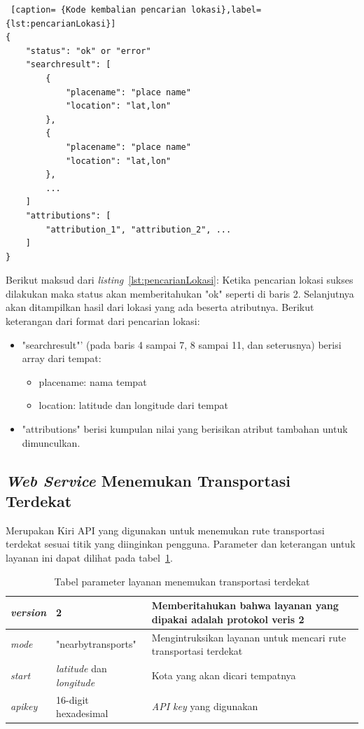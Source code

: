 \begin{lstlisting} [caption= {Kode kembalian pencarian lokasi},label={lst:pencarianLokasi}]
{
    "status": "ok" or "error"
    "searchresult": [
        {
            "placename": "place name"
            "location": "lat,lon"
        },
        {
            "placename": "place name"
            "location": "lat,lon"
        },
        ...
    ]
    "attributions": [
        "attribution_1", "attribution_2", ...
    ]
}
\end{lstlisting}
Berikut maksud dari \textit{listing}~\ref{lst:pencarianLokasi}: 
\newline
\hspace{0.5cm} Ketika pencarian lokasi sukses dilakukan maka status akan memberitahukan "ok" seperti di baris 2. Selanjutnya akan ditampilkan hasil dari lokasi yang ada beserta atributnya. Berikut keterangan dari format dari pencarian lokasi:
\begin{itemize}
	\item "searchresult"' (pada baris 4 sampai 7, 8 sampai 11, dan seterusnya) berisi array dari tempat:
	\begin{itemize}
		\item placename: nama tempat
		\item location: latitude dan longitude dari tempat
	\end{itemize}
	\item "attributions" berisi kumpulan nilai yang berisikan atribut tambahan untuk dimunculkan.
\end{itemize}	

\subsection{\textit{Web Service} Menemukan Transportasi Terdekat}
\label{subsec:Service Menemukan Transportasi Terdekat}
\hspace{0.5cm} Merupakan Kiri API yang digunakan untuk menemukan rute transportasi terdekat sesuai titik yang diinginkan pengguna. Parameter dan keterangan untuk layanan ini dapat dilihat pada tabel~\ref{tab:transportasiTerdekat}.

\begin{table}[H]
	\centering
		\begin{tabular}{ |p{2cm}|p{4cm}|p{8cm}| }
			\hline
			\textit{version} & 2 &  Memberitahukan bahwa layanan yang dipakai adalah protokol veris 2 \\ \hline
			\textit{mode} & "nearbytransports" & Mengintruksikan layanan untuk mencari rute transportasi terdekat \\ \hline
			\textit{start} & \textit{latitude} dan \textit{longitude} & Kota yang akan dicari tempatnya \\ \hline
			\textit{apikey} & 16-digit hexadesimal & \textit{API key} yang digunakan \\ \hline
			\hline
		\end{tabular}
	\caption{Tabel parameter layanan menemukan transportasi terdekat}
	\label{tab:transportasiTerdekat}
\end{table}


